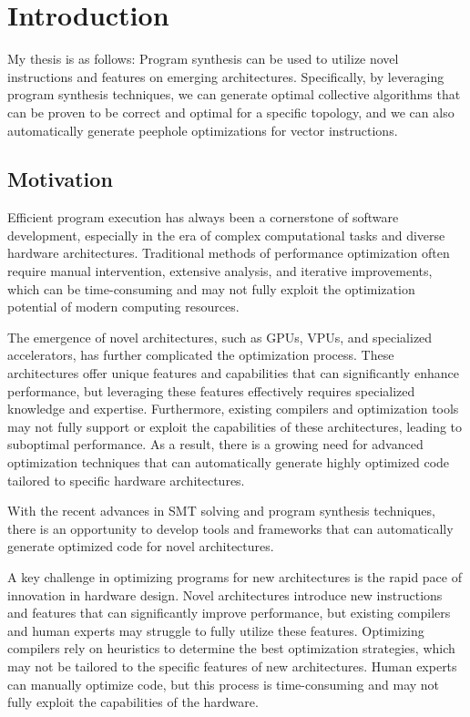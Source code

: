 \chapter{Introduction}
\label{chap:intro}


My thesis is as follows: Program synthesis can be used to
 utilize novel instructions and features on emerging
architectures. Specifically, by leveraging program synthesis
techniques, we can generate optimal collective algorithms that can be
proven to be correct and optimal for a specific topology, and we can
also automatically generate peephole optimizations for vector
instructions.


\section{Motivation}

Efficient program execution has always been a cornerstone of software
development, especially in the era of complex computational tasks and
diverse hardware architectures. Traditional methods of performance
optimization often require manual intervention, extensive analysis,
and iterative improvements, which can be time-consuming and may not
fully exploit the optimization potential of modern computing
resources.

The emergence of novel architectures, such as GPUs, VPUs, and
specialized accelerators, has further complicated the optimization
process. These architectures offer unique features and capabilities
that can significantly enhance performance, but leveraging these
features effectively requires specialized knowledge and expertise.
Furthermore, existing compilers and optimization tools may not fully
support or exploit the capabilities of these architectures, leading to
suboptimal performance. As a result, there is a growing need for
advanced optimization techniques that can automatically generate
highly optimized code tailored to specific hardware architectures.

With the recent advances in SMT solving and program synthesis
techniques, there is an opportunity to develop tools and frameworks
that can automatically generate optimized code for novel
architectures.



A key challenge in optimizing programs for new architectures is the
rapid pace of innovation in hardware design. Novel architectures
introduce new instructions and features that can significantly improve
performance, but existing compilers and human experts may
struggle to fully utilize these features. Optimizing compilers rely on
heuristics to determine the best optimization strategies, which may not
be tailored to the specific features of new architectures. Human
experts can manually optimize code, but this process is time-consuming
and may not fully exploit the capabilities of the hardware.


